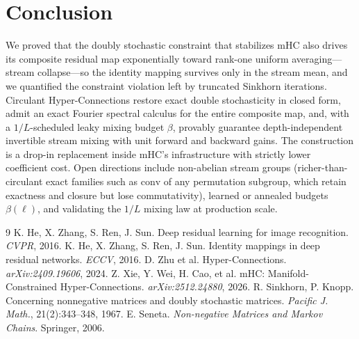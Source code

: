 \documentclass[11pt]{article}
\begin{document}
\section{Conclusion}
We proved that the doubly stochastic constraint that stabilizes mHC also drives its composite residual map exponentially toward rank-one uniform averaging---stream collapse---so the identity mapping survives only in the stream mean, and we quantified the constraint violation left by truncated Sinkhorn iterations. Circulant Hyper-Connections restore exact double stochasticity in closed form, admit an exact Fourier spectral calculus for the entire composite map, and, with a $1/L$-scheduled leaky mixing budget $\beta$, provably guarantee depth-independent invertible stream mixing with unit forward and backward gains. The construction is a drop-in replacement inside mHC's infrastructure with strictly lower coefficient cost. Open directions include non-abelian stream groups (richer-than-circulant exact families such as $\mathrm{conv}$ of any permutation subgroup, which retain exactness and closure but lose commutativity), learned or annealed budgets $\beta(\ell)$, and validating the $1/L$ mixing law at production scale.

\begin{thebibliography}{9}
 K. He, X. Zhang, S. Ren, J. Sun. Deep residual learning for image recognition. \emph{CVPR}, 2016.
 K. He, X. Zhang, S. Ren, J. Sun. Identity mappings in deep residual networks. \emph{ECCV}, 2016.
 D. Zhu et al. Hyper-Connections. \emph{arXiv:2409.19606}, 2024.
 Z. Xie, Y. Wei, H. Cao, et al. mHC: Manifold-Constrained Hyper-Connections. \emph{arXiv:2512.24880}, 2026.
 R. Sinkhorn, P. Knopp. Concerning nonnegative matrices and doubly stochastic matrices. \emph{Pacific J. Math.}, 21(2):343--348, 1967.
 E. Seneta. \emph{Non-negative Matrices and Markov Chains}. Springer, 2006.
\end{thebibliography}
\end{document}

